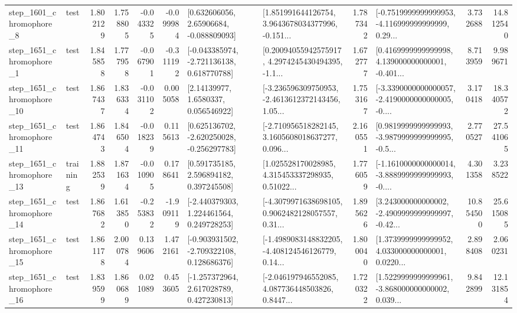 \begin{tabular}{llrrrrllrlrr}
  step\_1601\_chromophore\_8 &      test &      1.802129 &    1.758805 &     -0.043325 & -0.099984 &     [0.632606056, 2.65906684, -0.088809093] &  [1.851991644126754, 3.9643678034377996, -0.151... &       1.787342 &  [-0.7519999999999953, -4.116999999999999, 0.29... &            3.732688 &         14.812540 \\
  step\_1651\_chromophore\_1 &      test &      1.845858 &    1.777958 &     -0.067901 & -0.311192 &   [-0.043385974, -2.721136138, 0.618770788] &  [0.20094055942575917, 4.2974245430494395, -1.1... &       1.672777 &  [0.4169999999999998, 4.139000000000001, -0.401... &            8.713959 &          9.989671 \\
 step\_1651\_chromophore\_10 &      test &      1.867437 &    1.836334 &     -0.031102 &  0.005058 &        [2.14139977, 1.6580337, 0.056546922] &  [-3.236596309750953, -2.4613612372143456, 1.05... &       1.753167 &  [-3.3390000000000057, -2.4190000000000005, -0.... &            3.170418 &         18.340572 \\
 step\_1651\_chromophore\_11 &      test &      1.864743 &    1.846504 &     -0.018239 &  0.115613 &   [0.625136702, -2.620250028, -0.256297783] &  [-2.710956518282145, 3.1605608018637277, 0.096... &       2.160551 &  [0.9819999999999993, -3.9879999999999995, -0.5... &            2.770527 &         27.541065 \\
 step\_1651\_chromophore\_13 &  training &      1.882539 &    1.871634 &     -0.010905 &  0.178641 &     [0.591735185, 2.596894182, 0.397245508] &  [1.025528170028985, 4.315453337298935, 0.51022... &       1.776059 &  [-1.1610000000000014, -3.8889999999999993, -0.... &            4.301358 &          3.238522 \\
 step\_1651\_chromophore\_14 &      test &      1.867682 &    1.613850 &     -0.253832 & -1.909119 &    [-2.440379303, 1.224461564, 0.249728253] &  [-4.3079971638698105, 0.9062482128057557, 0.31... &       1.895626 &  [3.243000000000002, -2.4909999999999997, -0.42... &           10.854500 &         25.615085 \\
 step\_1651\_chromophore\_15 &      test &      1.861178 &    2.000784 &      0.139606 &  1.472161 &   [-0.903931502, -2.709322108, 0.128686376] &  [-1.4989083148832205, -4.408124546126779, 0.14... &       1.800040 &  [1.3739999999999952, 4.033000000000001, 0.0220... &            2.898408 &          2.060231 \\
 step\_1651\_chromophore\_16 &      test &      1.839599 &    1.860689 &      0.021089 &  0.453605 &    [-1.257372964, 2.617028789, 0.427230813] &  [-2.046197946552085, 4.087736448503826, 0.8447... &       1.720322 &  [1.5229999999999961, -3.868000000000002, 0.039... &            9.842899 &         12.131854 \\

\end{tabular}

